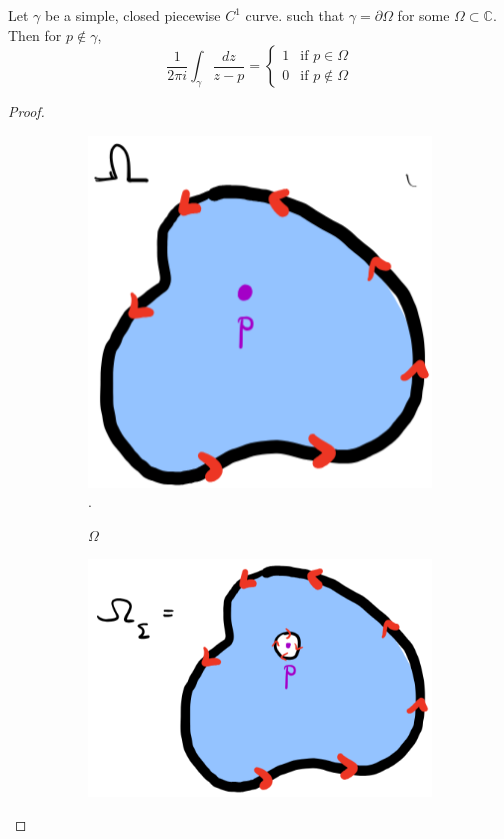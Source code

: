 \begin{example}
    Let $\gamma$ be a simple, closed piecewise $C^1$ curve. such that $\gamma = \partial \Omega$ for some $\Omega \subset \mathbb{C}$. Then for $ p \notin \gamma$,
    $$ \frac{1}{2\pi i} \int_{\gamma} \frac{dz}{z - p} = \begin{cases}
            1 & \text{if } p \in \Omega    \\
            0 & \text{if } p \notin \Omega
        \end{cases} $$
    \begin{proof}
        \begin{figure}[H]
            \centering
            \begin{subfigure}{0.4\textwidth}
                \centering
                \includegraphics[width=\textwidth]{LECTURE_4/omega.png}.
                \caption{$\Omega$}
            \end{subfigure}
            \hfill
            \begin{subfigure}{0.4\textwidth}
                \centering
                \includegraphics[width=\textwidth]{LECTURE_4/omega-epsilon.png}

\end{subfigure}
\end{figure}
\end{proof}
\end{example}
